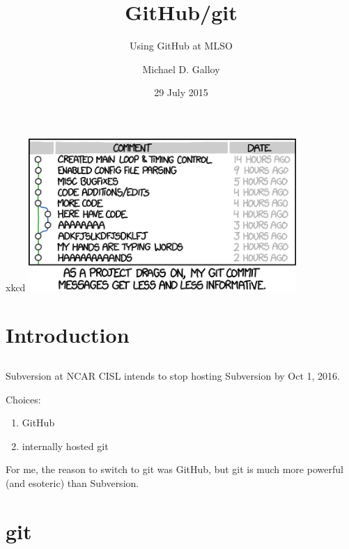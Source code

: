 \documentclass{beamer}
\title{GitHub/git}
\subtitle{Using GitHub at MLSO}
\author{Michael D. Galloy}
\institute[NCAR/MLSO]{NCAR/MLSO}
\date{29 July 2015}
\begin{document}
\begin{frame}{xkcd}
  \includegraphics[width=4in]{git_commit.png}
\end{frame}

\begin{frame}[plain]
  \titlepage
\end{frame}


\section{Introduction}
\subsection*{}

\begin{frame}
  \tableofcontents
\end{frame}

\begin{frame}{Subversion at NCAR}
CISL intends to stop hosting Subversion by Oct 1, 2016.

\vspace{1em}

Choices:
  \begin{enumerate}
    \item GitHub
    \item internally hosted git
  \end{enumerate}
For me, the reason to switch to git was GitHub, but git is much more powerful (and esoteric) than Subversion.
\end{frame}


\section{git}
\end{document}
